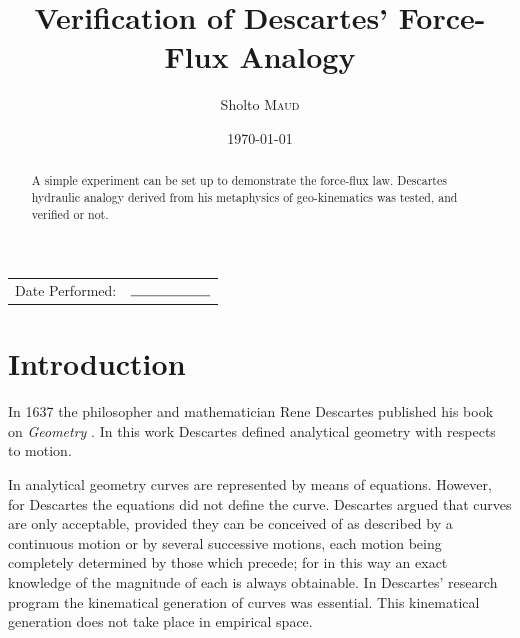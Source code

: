 \documentclass{article}
\title{Verification of Descartes' Force-Flux Analogy \\
   } %
\author{Sholto \textsc{Maud}} %
\date{\today} %
\begin{document}
\maketitle %

\begin{center}
\begin{tabular}{l r}
Date Performed: & $\rule{2cm}{0.15mm}$ \\ %
\end{tabular}
\end{center}

\begin{abstract}
A simple experiment can be set up to demonstrate the force-flux law.  Descartes hydraulic analogy derived from his metaphysics of geo-kinematics was tested, and verified or not.

\end{abstract}


\section{Introduction}

In 1637 the philosopher and mathematician Rene Descartes published his book on \textit{Geometry} \cite{descartes_geometry_1925}. In this work Descartes defined analytical geometry with respects to motion.

In analytical geometry curves are represented by means of equations. However, for Descartes the equations did not define the curve. Descartes argued that curves are only acceptable, provided they can be conceived of as described by a continuous motion or by several successive motions, each motion being completely determined by those which precede; for in this way an exact knowledge of the magnitude of each is always obtainable. In Descartes’ research program the kinematical generation of curves was essential. This kinematical generation does not take place in empirical space.
\end{document}

